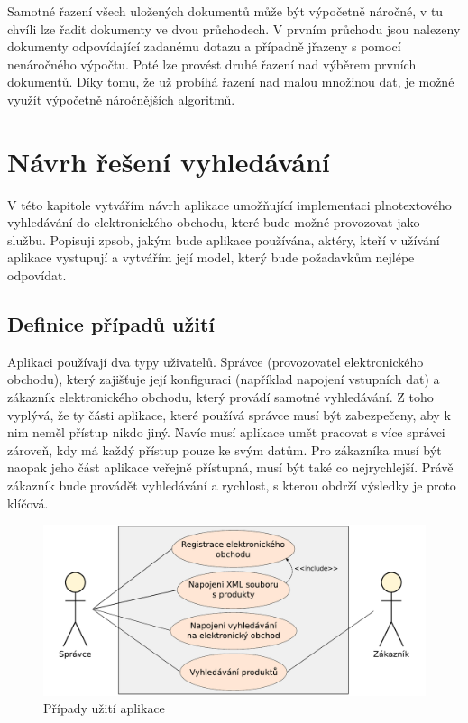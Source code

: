 \documentclass[FM,DP]{tulthesis}
\begin{document}
Samotné řazení všech uložených dokumentů může být výpočetně náročné, v tu chvíli lze řadit
dokumenty ve dvou průchodech. V prvním průchodu jsou nalezeny dokumenty odpovídající zadanému 
dotazu a případně jřazeny s pomocí nenáročného výpočtu. Poté lze provést druhé řazení nad výběrem 
prvních dokumentů. Díky tomu, že už probíhá řazení nad malou množinou dat, je možné využít 
výpočetně náročnějších algoritmů.


\chapter{Návrh řešení vyhledávání}

V této kapitole vytvářím návrh aplikace umožňující implementaci plnotextového vyhledávání
do elektronického obchodu, které bude možné provozovat jako službu. Popisuji zpsob, 
jakým bude aplikace používána, aktéry, kteří v užívání aplikace vystupují a vytvářím
její model, který bude požadavkům nejlépe odpovídat.

\section{Definice případů užití}

Aplikaci používají dva typy uživatelů. Správce (provozovatel elektronického obchodu), který
zajišťuje její konfiguraci (například napojení vstupních dat) a zákazník elektronického
obchodu, který provádí samotné vyhledávání. Z toho vyplývá, že ty části aplikace, které používá 
správce musí být zabezpečeny, aby k nim neměl přístup nikdo jiný. Navíc musí aplikace umět
pracovat s více správci zároveň, kdy má každý přístup pouze ke svým datům. Pro zákazníka
musí být naopak jeho část aplikace veřejně přístupná, musí být také co nejrychlejší. 
Právě zákazník bude provádět vyhledávání a rychlost, s kterou obdrží výsledky je proto
klíčová.

\begin{figure}[h]
\center
\includegraphics[width=\textwidth]{use-case.pdf}
\caption{Případy užití aplikace}
\label{use-case}
\end{figure}
\end{document}
